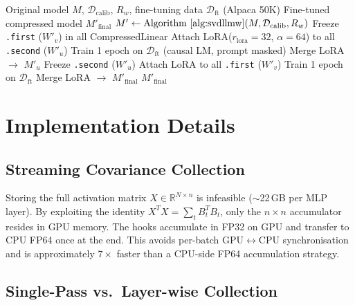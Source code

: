 \documentclass[11pt,a4paper]{article}
\newcommand{\Rbb}{\mathbb{R}}
\theoremstyle{remark}
\begin{document}
\begin{algorithm}[H]
\caption{SVD-LLM --- Whitening + Sequential LoRA}
\label{alg:svdllm}
\begin{algorithmic}[1]
\Require Original model $M$, $\mathcal{D}_\text{calib}$, $R_w$,
         fine-tuning data $\mathcal{D}_\text{ft}$ (Alpaca 50K)
\Ensure Fine-tuned compressed model $M'_\text{final}$
\State $M' \gets \text{Algorithm~\ref{alg:svdllmw}}(M,
       \mathcal{D}_\text{calib}, R_w)$
\Statex {}
\State Freeze \texttt{.first} ($W'_v$) in all CompressedLinear
\State Attach LoRA($r_\text{lora}{=}32$, $\alpha{=}64$)
       to all \texttt{.second} ($W'_u$)
\State Train 1 epoch on $\mathcal{D}_\text{ft}$
       (causal LM, prompt masked)
\State Merge LoRA $\to$ $M'_u$
\Statex {}
\State Freeze \texttt{.second} ($W'_u$)
\State Attach LoRA to all \texttt{.first} ($W'_v$)
\State Train 1 epoch on $\mathcal{D}_\text{ft}$
\State Merge LoRA $\to$ $M'_\text{final}$
\State \Return $M'_\text{final}$
\end{algorithmic}
\end{algorithm}

\section{Implementation Details}
\label{sec:impl}

\subsection{Streaming Covariance Collection}

Storing the full activation matrix $X \in \Rbb^{N \times n}$ is infeasible
($\sim$22\,GB per MLP layer).  By exploiting the identity
$X^TX = \sum_t B_t^TB_t$, only the $n \times n$ accumulator resides in GPU
memory.  The hooks accumulate in FP32 on GPU and transfer to CPU FP64 once at
the end.  This avoids per-batch GPU$\leftrightarrow$CPU synchronisation and is
approximately $7\times$ faster than a CPU-side FP64 accumulation strategy.

\subsection{Single-Pass vs.\ Layer-wise Collection}
\end{document}
